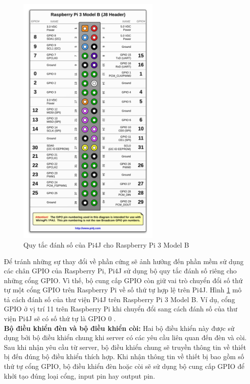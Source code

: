 \documentclass[12pt,a4paper,oneside]{extbook}
\begin{document}
\begin{figure}[h]
  \centering
     \includegraphics[width=7cm]{4-pi4j-danh-so}
  \caption{Quy tắc đánh số của Pi4J cho Raspberry Pi 3 Model B}\label{fig:4-pi4j-danh-so}
\end{figure}

\noindent
Để tránh những sự thay đổi về phần cứng sẽ ảnh hưởng đến phần mềm sử dụng các chân GPIO của Raspberry Pi, Pi4J sử dụng bộ quy tắc đánh số riêng cho những cổng GPIO. Vì thế, bộ cung cấp GPIO còn giữ vai trò chuyển đổi số thứ tự một cổng GPIO trên Raspberry Pi về số thứ tự hợp lệ trên Pi4J. Hình \ref{fig:4-pi4j-danh-so} mô tả cách đánh số của thư viện Pi4J trên Raspberry Pi 3 Model B. Ví dụ, cổng GPIO ở vị trí 11 trên Raspberry Pi khi chuyển đổi sang cách đánh số của thư viện Pi4J sẽ có số thứ tự là GPIO 0 \cite{pi4j-numbering}.\\

\noindent
\textbf{Bộ điều khiển đèn và bộ điều khiển còi:} Hai bộ điều khiển này được sử dụng bởi bộ điều khiển chung khi server có các yêu cầu liên quan đến đèn và còi. Sau khi nhận yêu cầu từ server, bộ điều khiển chung sẽ truyền thông tin về thiết bị đến đúng bộ điều khiển thích hợp. Khi nhận thông tin về thiết bị bao gồm số thứ tự cổng GPIO, bộ điều khiển đèn hoặc còi sẽ sử dụng bộ cung cấp GPIO để khởi tạo đúng loại cổng, input pin hay output pin.\\
\end{document}
